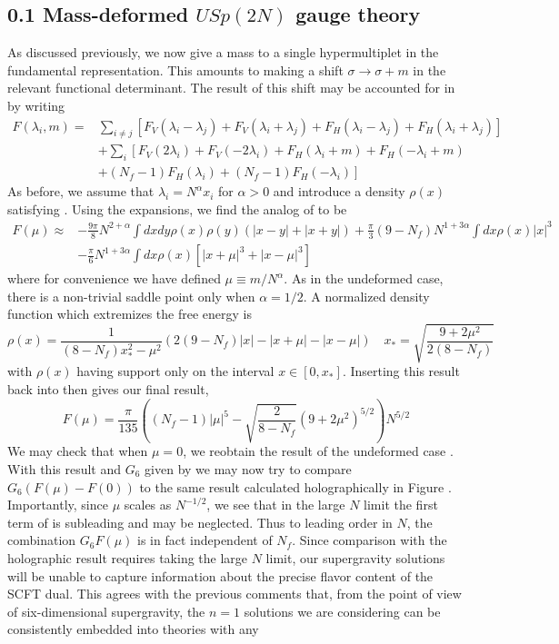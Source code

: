 \documentclass{article}
\begin{document}
\subsection*{0.1 Mass-deformed \(U S p(2 N)\) gauge theory}
As discussed previously, we now give a mass to a single hypermultiplet in the fundamental representation. This amounts to making a shift \(\sigma \rightarrow \sigma+m\) in the relevant functional determinant. The result of this shift may be accounted for in by writing
\[
\begin{aligned}
F(\lambda_{i}, m)= & \sum_{i \neq j}\left[F_{V}\left(\lambda_{i}-\lambda_{j}\right)+F_{V}\left(\lambda_{i}+\lambda_{j}\right)+F_{H}\left(\lambda_{i}-\lambda_{j}\right)+F_{H}\left(\lambda_{i}+\lambda_{j}\right)\right] \\
& +\sum_{i}\left[F_{V}\left(2 \lambda_{i}\right)+F_{V}\left(-2 \lambda_{i}\right)+F_{H}\left(\lambda_{i}+m\right)+F_{H}\left(-\lambda_{i}+m\right)\right. \\
& \left.+\left(N_{f}-1\right) F_{H}\left(\lambda_{i}\right)+\left(N_{f}-1\right) F_{H}\left(-\lambda_{i}\right)\right]
\end{aligned}
\]
As before, we assume that \(\lambda_{i}=N^{\alpha} x_{i}\) for \(\alpha>0\) and introduce a density \(\rho(x)\) satisfying . Using the expansions, we find the analog of to be
\[
\begin{aligned}
F(\mu) \approx & -\frac{9 \pi}{8} N^{2+\alpha} \int d x d y \rho(x) \rho(y)(|x-y|+|x+y|)+\frac{\pi}{3}\left(9-N_{f}\right) N^{1+3 \alpha} \int d x \rho(x)|x|^{3} \\
& -\frac{\pi}{6} N^{1+3 \alpha} \int d x \rho(x)\left[|x+\mu|^{3}+|x-\mu|^{3}\right]
\end{aligned}
\]
where for convenience we have defined \(\mu \equiv m / N^{\alpha}\). As in the undeformed case, there is a non-trivial saddle point only when \(\alpha=1 / 2\). A normalized density function which extremizes the free energy is
\[
\rho(x)=\frac{1}{\left(8-N_{f}\right) x_{\ast}^{2}-\mu^{2}}\left(2\left(9-N_{f}\right)|x|-|x+\mu|-|x-\mu|\right) \quad x_{\ast}=\sqrt{\frac{9+2 \mu^{2}}{2\left(8-N_{f}\right)}}
\]
with \(\rho(x)\) having support only on the interval \(x \in\left[0, x_{*}\right]\). Inserting this result back into then gives our final result,
\[
F(\mu)=\frac{\pi}{135}\left(\left(N_{f}-1\right)|\mu|^{5}-\sqrt{\frac{2}{8-N_{f}}}\left(9+2 \mu^{2}\right)^{5 / 2}\right) N^{5 / 2}
\]
We may check that when \(\mu=0\), we reobtain the result of the undeformed case . With this result and \(G_{6}\) given by we may now try to compare \(G_{6}(F(\mu)-F(0))\) to the same result calculated holographically in Figure . Importantly, since \(\mu\) scales as \(N^{-1 / 2}\), we see that in the large \(N\) limit the first term of is subleading and may be neglected. Thus to leading order in \(N\), the combination \(G_{6} F(\mu)\) is in fact independent of \(N_{f}\). Since comparison with the holographic result requires taking the large \(N\) limit, our supergravity solutions will be unable to capture information about the precise flavor content of the SCFT dual. This agrees with the previous comments that, from the point of view of six-dimensional supergravity, the \(n=1\) solutions we are considering can be consistently embedded into theories with any
\end{document}
